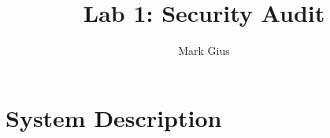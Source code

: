 \documentclass[11pt]{article}
\begin{document}
\author{Mark Gius}
\title{Lab 1: Security Audit}
\maketitle

\section{System Description}
\end{document}
